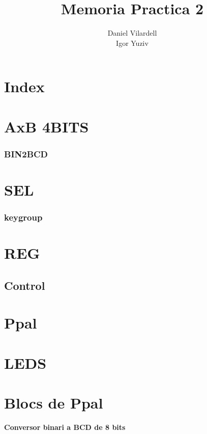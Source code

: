 \documentclass[12pt, a4papre]{article}
\author{Daniel Vilardell\\
	   Igor Yuziv}
\title{Memoria Practica 2}
\date{}
\begin{document}
	\maketitle
	\newpage


	\section*{Index}
     \section {AxB 4BITS}
     \subsubsection{BIN2BCD}
     \section {SEL}
     \subsubsection{keygroup}
     \section {REG}
     \subsection{Control}
     \section{Ppal}
     \section{LEDS}
     \section {Blocs de Ppal}
     
     \newpage


	
	
	\textbf{\large{Conversor binari a BCD de 8 bits}}
	
\end{document}

